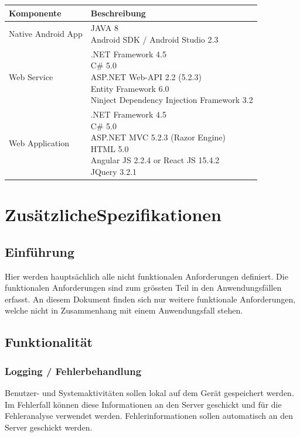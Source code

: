 \documentclass[a4paper,10pt,xetex]{article}
\makeatletter
\newcommand{\specialcell}[2][c]{%
  \begin{tabular}[#1]{@{}l@{}}#2\end{tabular}}
\makeatother
\begin{document}
\begin{longtabu} to \textwidth { | l | X[l] | }
\hline
\textbf{Komponente} & \textbf{Beschreibung} \\\hline
\endhead

Native Android App & \specialcell{JAVA 8\\Android SDK / Android Studio 2.3}\\\hline
Web Service & \specialcell{.NET Framework 4.5\\C\# 5.0\\ASP.NET Web-API 2.2 (5.2.3)\\Entity Framework 6.0\\Ninject Dependency Injection Framework 3.2}\\\hline
Web Application & \specialcell{.NET Framework 4.5\\C\# 5.0\\ASP.NET MVC 5.2.3 (Razor Engine)\\HTML 5.0\\Angular JS 2.2.4 or React JS 15.4.2\\JQuery 3.2.1}\\\hline
\end{longtabu}


\section{ZusätzlicheSpezifikationen}\label{zusuxe4tzliche-spezifikationen}
\subsection{Einführung}\label{einfuxfchrung}
Hier werden hauptsächlich alle nicht funktionalen Anforderungen
definiert. Die funktionalen Anforderungen sind zum grössten Teil in den
Anwendungsfällen erfasst. An diesem Dokument finden sich nur weitere
funktionale Anforderungen, welche nicht in Zusammenhang mit einem
Anwendungsfall stehen.


\subsection{Funktionalität}\label{funktionalituxe4t}
\subsubsection{Logging / Fehlerbehandlung}\label{logging-fehlerbehandlung}
Benutzer- und Systemaktivitäten sollen lokal auf dem Gerät gespeichert
werden. Im Fehlerfall können diese Informationen an den Server geschickt
und für die Fehleranalyse verwendet werden. Fehlerinformationen sollen
automatisch an den Server geschickt werden.
\end{document}

